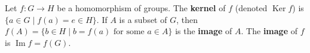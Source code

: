 \begin{definition}
Let $f: G \rightarrow H$ be a homomorphism of groups. The \textbf{kernel} of $f$ (denoted $\operatorname{Ker} f$) is $\{a \in G \mid f(a) = e \in H\}$. If $A$ is a subset of $G$, then $f(A) = \{b \in H \mid b = f(a) \text{ for some } a \in A\}$ is the \textbf{image} of $A$. The \textbf{image} of $f$ is $\operatorname{Im} f = f(G)$.
\end{definition}
